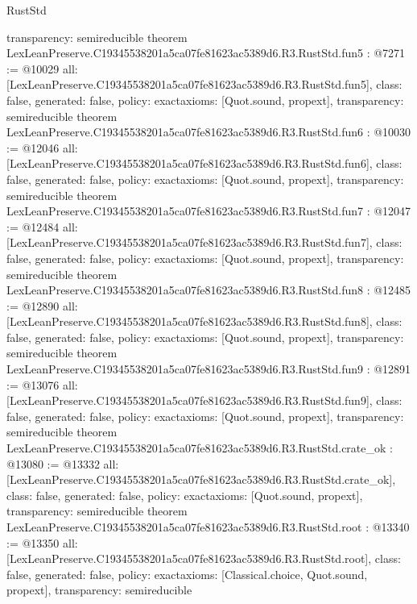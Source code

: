 \begin{lexlean}{RustStd}
\begin{coremodule}
{  transparency: semireducible
}
theorem LexLeanPreserve.C19345538201a5ca07fe81623ac5389d6.R3.RustStd.fun5 : @7271 := @10029 {
  all: [LexLeanPreserve.C19345538201a5ca07fe81623ac5389d6.R3.RustStd.fun5],
  class: false,
  generated: false,
  policy: exact{axioms: [Quot.sound, propext]},
  transparency: semireducible
}
theorem LexLeanPreserve.C19345538201a5ca07fe81623ac5389d6.R3.RustStd.fun6 : @10030 := @12046 {
  all: [LexLeanPreserve.C19345538201a5ca07fe81623ac5389d6.R3.RustStd.fun6],
  class: false,
  generated: false,
  policy: exact{axioms: [Quot.sound, propext]},
  transparency: semireducible
}
theorem LexLeanPreserve.C19345538201a5ca07fe81623ac5389d6.R3.RustStd.fun7 : @12047 := @12484 {
  all: [LexLeanPreserve.C19345538201a5ca07fe81623ac5389d6.R3.RustStd.fun7],
  class: false,
  generated: false,
  policy: exact{axioms: [Quot.sound, propext]},
  transparency: semireducible
}
theorem LexLeanPreserve.C19345538201a5ca07fe81623ac5389d6.R3.RustStd.fun8 : @12485 := @12890 {
  all: [LexLeanPreserve.C19345538201a5ca07fe81623ac5389d6.R3.RustStd.fun8],
  class: false,
  generated: false,
  policy: exact{axioms: [Quot.sound, propext]},
  transparency: semireducible
}
theorem LexLeanPreserve.C19345538201a5ca07fe81623ac5389d6.R3.RustStd.fun9 : @12891 := @13076 {
  all: [LexLeanPreserve.C19345538201a5ca07fe81623ac5389d6.R3.RustStd.fun9],
  class: false,
  generated: false,
  policy: exact{axioms: [Quot.sound, propext]},
  transparency: semireducible
}
theorem LexLeanPreserve.C19345538201a5ca07fe81623ac5389d6.R3.RustStd.crate_ok : @13080 := @13332 {
  all: [LexLeanPreserve.C19345538201a5ca07fe81623ac5389d6.R3.RustStd.crate_ok],
  class: false,
  generated: false,
  policy: exact{axioms: [Quot.sound, propext]},
  transparency: semireducible
}
theorem LexLeanPreserve.C19345538201a5ca07fe81623ac5389d6.R3.RustStd.root : @13340 := @13350 {
  all: [LexLeanPreserve.C19345538201a5ca07fe81623ac5389d6.R3.RustStd.root],
  class: false,
  generated: false,
  policy: exact{axioms: [Classical.choice, Quot.sound, propext]},
  transparency: semireducible
}


\end{coremodule}
\end{lexlean}
